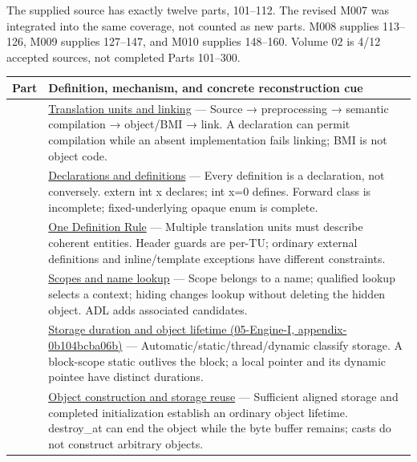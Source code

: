 The supplied source has exactly twelve parts, 101--112. The revised M007 was integrated into the same coverage, not counted as new parts. M008 supplies 113--126, M009 supplies 127--147, and M010 supplies 148--160. Volume 02 is 4/12 accepted sources, not completed Parts 101--300.

{\def\LTcaptype{none} %
\begin{longtable}[]{@{}
  >{\raggedright\arraybackslash}p{}
  >{\raggedright\arraybackslash}p{}@{}}
\toprule\noalign{}
\begin{minipage}[b]{\linewidth}\raggedright
Part
\end{minipage} & \begin{minipage}[b]{\linewidth}\raggedright
Definition, mechanism, and concrete reconstruction cue
\end{minipage} \\
\midrule\noalign{}
\endhead
\bottomrule\noalign{}
\endlastfoot
101 & \hyperref[appendix-806686359e1b]{Translation units and linking} --- Source → preprocessing → semantic compilation → object/BMI → link. A declaration can permit compilation while an absent implementation fails linking; BMI is not object code. \\
102 & \hyperref[appendix-2e4d494c2d94]{Declarations and definitions} --- Every definition is a declaration, not conversely. extern int x declares; int x=0 defines. Forward class is incomplete; fixed-underlying opaque enum is complete. \\
103 & \hyperref[appendix-49d27bc9d9a5]{One Definition Rule} --- Multiple translation units must describe coherent entities. Header guards are per-TU; ordinary external definitions and inline/template exceptions have different constraints. \\
104 & \hyperref[appendix-b12b31759da1]{Scopes and name lookup} --- Scope belongs to a name; qualified lookup selects a context; hiding changes lookup without deleting the hidden object. ADL adds associated candidates. \\
105 & \href{../05-Engine-I/main.pdf\#nameddest=appendix-0b104bcba06b}{Storage duration and object lifetime (05-Engine-I, appendix-0b104bcba06b)} --- Automatic/static/thread/dynamic classify storage. A block-scope static outlives the block; a local pointer and its dynamic pointee have distinct durations. \\
106 & \hyperref[appendix-a82f9c438857]{Object construction and storage reuse} --- Sufficient aligned storage and completed initialization establish an ordinary object lifetime. destroy\_at can end the object while the byte buffer remains; casts do not construct arbitrary objects. \\

\end{longtable}}
